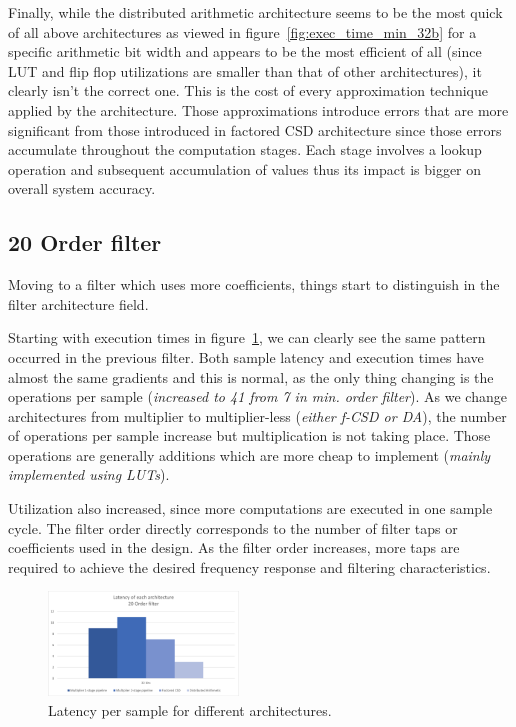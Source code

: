 Finally, while the distributed arithmetic architecture seems to be the most quick of all above architectures as viewed in figure~\ref{fig:exec_time_min_32b} for a specific arithmetic bit width and appears to be the most efficient of all (since LUT and flip flop utilizations are smaller than that of other architectures), it clearly isn't the correct one. This is the cost of every approximation technique applied by the architecture.
Those approximations introduce errors that are more significant from those introduced in factored CSD architecture since those errors accumulate throughout the computation stages. Each stage involves a lookup operation and subsequent accumulation of values thus its impact is bigger on overall system accuracy.

\subsection{20 Order filter}
Moving to a filter which uses more coefficients, things start to distinguish in the filter architecture field.

Starting with execution times in figure~\ref{fig:fir_20_hdl_latency}, we can clearly see the same pattern occurred in the previous filter. Both sample latency and execution times have almost the same gradients and this is normal, as the only thing changing is the operations per sample (\textit{increased to 41 from 7 in min. \hspace{-10pt} order filter}). As we change architectures from multiplier to multiplier-less (\textit{either f-CSD or DA}), the number of operations per sample increase but multiplication is not taking place. Those operations are generally additions which are more cheap to implement (\textit{mainly implemented using LUTs}).

Utilization also increased, since more computations are executed in one sample cycle.
The filter order directly corresponds to the number of filter taps or coefficients used in the design. As the filter order increases, more taps are required to achieve the desired frequency response and filtering characteristics.

\begin{figure}[htpb]
	\centering
	\includegraphics[width=0.45\textwidth]{../Images/FIR_20_Order/hdl_latency.png}
	\caption{Latency per sample for different architectures.}
	\label{fig:fir_20_hdl_latency}
\end{figure}


